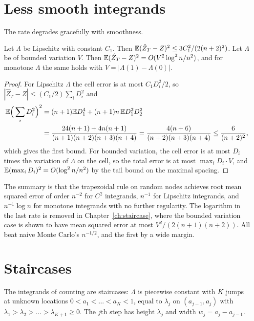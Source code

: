 \section{Less smooth integrands}

The rate degrades gracefully with smoothness.

\begin{theorem}
\label{thm:lipbv}
Let $\Lambda$ be Lipschitz with constant $C_1$. Then $\mathbb{E} (\hat Z_T - Z)^2 \le 3 C_1^2 / (2 (n+2)^2)$. Let $\Lambda$ be of bounded variation $V$. Then $\mathbb{E} (\hat Z_T - Z)^2 = O(V^2 \log^2 n / n^2)$, and for monotone $\Lambda$ the same holds with $V = |\Lambda(1) - \Lambda(0)|$.
\end{theorem}

\begin{proof}
For Lipschitz $\Lambda$ the cell error is at most $C_1 D_i^2 / 2$, so $|\hat Z_T - Z| \le (C_1/2) \sum_i D_i^2$ and
\[
\begin{aligned}
\mathbb{E} \Big( \sum_i D_i^2 \Big)^2 &= (n+1) \mathbb{E} D_1^4 + (n+1) n \, \mathbb{E} D_1^2 D_2^2 \\ &= \frac{24 (n+1) + 4 n (n+1)}{(n+1)(n+2)(n+3)(n+4)} = \frac{4 (n+6)}{(n+2)(n+3)(n+4)} \le \frac{6}{(n+2)^2} ,
\end{aligned}
\]
which gives the first bound. For bounded variation, the cell error is at most $D_i$ times the variation of $\Lambda$ on the cell, so the total error is at most $\max_i D_i \cdot V$, and $\mathbb{E} (\max_i D_i)^2 = O(\log^2 n / n^2)$ by the tail bound on the maximal spacing.
\end{proof}

The summary is that the trapezoidal rule on random nodes achieves root mean squared error of order $n^{-2}$ for $C^2$ integrands, $n^{-1}$ for Lipschitz integrands, and $n^{-1} \log n$ for monotone integrands with no further regularity. The logarithm in the last rate is removed in Chapter~\ref{ch:staircase}, where the bounded variation case is shown to have mean squared error at most $V^2 / (2(n+1)(n+2))$. All beat naive Monte Carlo's $n^{-1/2}$, and the first by a wide margin.

\section{Staircases}

The integrands of counting are staircases: $\Lambda$ is piecewise constant with $K$ jumps at unknown locations $0 < a_1 < \dots < a_K < 1$, equal to $\lambda_j$ on $(a_{j-1}, a_j)$ with $\lambda_1 > \lambda_2 > \dots > \lambda_{K+1} \ge 0$. The $j$th step has height $\lambda_j$ and width $w_j = a_j - a_{j-1}$.

